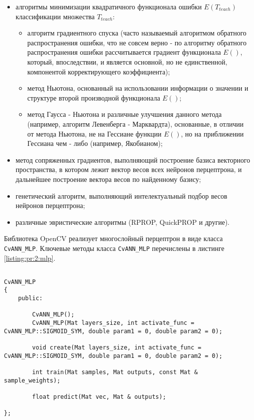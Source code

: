 \begin{itemize}

	\item алгоритмы минимизации квадратичного функционала ошибки $E(T_{teach})$ классификации множества $T_{teach}$:

	\begin{itemize}

		\item алгоритм градиентного спуска (часто называемый алгоритмом обратного распространения ошибки, что не совсем верно - по алгоритму обратного распространения ошибки рассчитывается градиент функционала $E()$, который, впоследствии, и является основной, но не единственной, компонентой корректирующего коэффициента);
		\item метод Ньютона, основанный на использовании информации о значении и структуре второй производной функционала $E()$;
		\item метод Гаусса - Ньютона и различные улучшения данного метода (например, алгоритм Левенберга - Марквардта), основанные, в отличии от метода Ньютона, не на Гессиане функции $E()$, но на приближении Гессиана чем - либо (например, Якобианом);
	
	\end{itemize}

	\item метод сопряженных градиентов, выполняющий построение базиса векторного пространства, в котором лежит вектор весов всех нейронов перцептрона, и дальнейшее построение вектора весов по найденному базису;
	\item генетический алгоритм, выполняющий интелектуальный подбор весов нейронов перцептрона;
	\item различные эвристические алгоритмы (RPROP, QuickPROP и другие).

\end{itemize}

Библиотека OpenCV реализует многослойный перцептрон в виде класса \verb|CvANN_MLP|. Ключевые методы класса \verb|CvANN_MLP| перечислены в листинге \ref{listing:pr:2:mlp}.

\begin{lstlisting}

CvANN_MLP
{
	public:
	
		CvANN_MLP();
		CvANN_MLP(Mat layers_size, int activate_func = CvANN_MLP::SIGMOID_SYM, double param1 = 0, double param2 = 0);

		void create(Mat layers_size, int activate_func = CvANN_MLP::SIGMOID_SYM, double param1 = 0, double param2 = 0);
		
		int train(Mat samples, Mat outputs, const Mat & sample_weights);
		
		float predict(Mat vec, Mat & outputs);

};

\end{lstlisting}
\mylistingend

